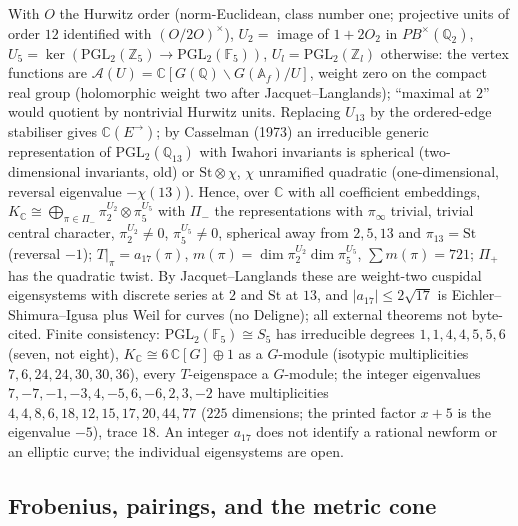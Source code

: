 \begin{theorem}
\label{thm:lps-spectrum-hecke}
With $O$ the Hurwitz order (norm-Euclidean, class number one; projective units of order $12$ identified with $(O/2O)^\times$),
$U_2 = $ image of $1+2O_2$ in $PB^\times(\mathbb Q_2)$, $U_5 = \ker(\mathrm{PGL}_2(\mathbb Z_5)\to\mathrm{PGL}_2(\mathbb F_5))$, $U_l = \mathrm{PGL}_2(\mathbb Z_l)$
otherwise: the vertex functions are $\mathcal A(U) = \mathbb C[G(\mathbb Q)\backslash G(\mathbb A_f)/U]$, weight zero on the compact real
group (holomorphic weight two after Jacquet--Langlands); ``maximal at $2$'' would quotient by nontrivial Hurwitz units.
Replacing $U_{13}$ by the ordered-edge stabiliser gives $\mathbb C(E^\to)$; by Casselman (1973) an irreducible generic
representation of $\mathrm{PGL}_2(\mathbb Q_{13})$ with Iwahori invariants is spherical (two-dimensional invariants, old) or
$\mathrm{St}\otimes\chi$, $\chi$ unramified quadratic (one-dimensional, reversal eigenvalue $-\chi(13)$). Hence, over $\mathbb C$ with all
coefficient embeddings, $K_{\mathbb C}\cong\bigoplus_{\pi\in\Pi_-}\pi_2^{U_2}\otimes\pi_5^{U_5}$ with $\Pi_-$ the representations with
$\pi_\infty$ trivial, trivial central character, $\pi_2^{U_2}\ne0$, $\pi_5^{U_5}\ne0$, spherical away from $2,5,13$ and
$\pi_{13} = \mathrm{St}$ (reversal $-1$); $T|_\pi = a_{17}(\pi)$, $m(\pi) = \dim\pi_2^{U_2}\dim\pi_5^{U_5}$, $\sum m(\pi) = 721$; $\Pi_+$ has
the quadratic twist. By Jacquet--Langlands these are weight-two cuspidal eigensystems with discrete series at $2$ and
$\mathrm{St}$ at $13$, and $|a_{17}|\le2\sqrt{17}$ is Eichler--Shimura--Igusa plus Weil for curves (no Deligne); all external
theorems not byte-cited. Finite consistency: $\mathrm{PGL}_2(\mathbb F_5)\cong S_5$ has irreducible degrees $1,1,4,4,5,5,6$ (seven,
not eight), $K_{\mathbb C}\cong6\,\mathbb C[G]\oplus1$ as a $G$-module (isotypic multiplicities $7,6,24,24,30,30,36$), every
$T$-eigenspace a $G$-module; the integer eigenvalues $7,-7,-1,-3,4,-5,6,-6,2,3,-2$ have multiplicities
$4,4,8,6,18,12,15,17,20,44,77$ ($225$ dimensions; the printed factor $x+5$ is the eigenvalue $-5$), trace $18$. An integer
$a_{17}$ does not identify a rational newform or an elliptic curve; the individual eigensystems are open.
\end{theorem}

\subsection{Frobenius, pairings, and the metric cone}

